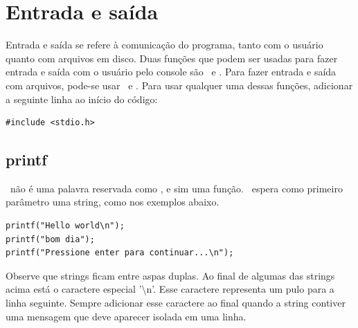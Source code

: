 \chapter{Entrada e saída}

Entrada e saída se refere à comunicação do programa, tanto com o usuário quanto com arquivos em disco. 
Duas funções que podem ser usadas para fazer entrada e saída com o usuário pelo console são \PRINTF\ e \SCANF. 
Para fazer entrada e saída com arquivos, pode-se usar \FPRINTF\ e \FSCANF. 
Para usar qualquer uma dessas funções, adicionar a seguinte linha ao início do código:

\begin{lstlisting}
#include <stdio.h> 
\end{lstlisting}


\section{printf}
\label{sec:printf}

\PRINTF\ não é uma palavra reservada como \WHILE, e sim uma função. \PRINTF\ espera como primeiro parâmetro uma string, como nos exemplos abaixo.

\begin{lstlisting}
printf("Hello world\n");
printf("bom dia");
printf("Pressione enter para continuar...\n");
\end{lstlisting}

Observe que strings ficam entre aspas duplas. Ao final de algumas das strings acima está o caractere especial '\textbackslash n'. Esse caractere representa um pulo para a linha seguinte. Sempre adicionar esse caractere ao final quando a string contiver uma mensagem que deve aparecer isolada em uma linha. 


